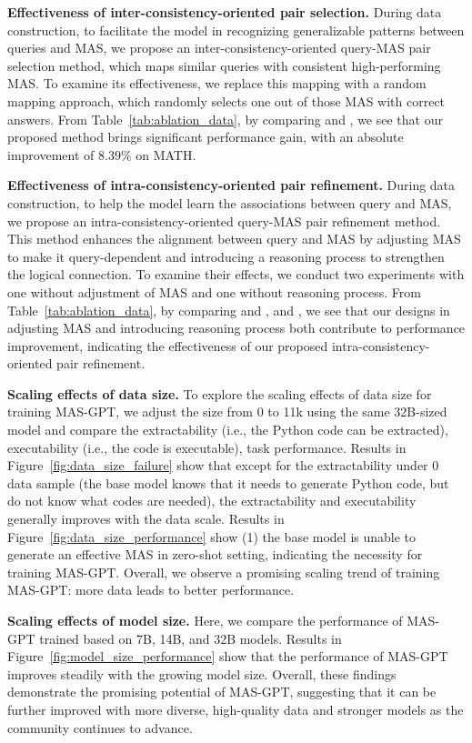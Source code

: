\documentclass{article}
\theoremstyle{plain}
\theoremstyle{definition}
\theoremstyle{remark}
\begin{document}
\textbf{Effectiveness of inter-consistency-oriented pair selection.}
During data construction, to facilitate the model in recognizing generalizable patterns between queries and MAS, we propose an inter-consistency-oriented query-MAS pair selection method, which maps similar queries with consistent high-performing MAS.
To examine its effectiveness, we replace this mapping with a random mapping approach, which randomly selects one out of those MAS with correct answers.
From Table~\ref{tab:ablation_data}, by comparing  and , we see that our proposed method brings significant performance gain, with an absolute improvement of $8.39\%$ on MATH.

\textbf{Effectiveness of intra-consistency-oriented pair refinement.}
During data construction, to help the model learn the associations between query and MAS, we propose an intra-consistency-oriented query-MAS pair refinement method.
This method enhances the alignment between query and MAS by adjusting MAS to make it query-dependent and introducing a reasoning process to strengthen the logical connection.
To examine their effects, we conduct two experiments with one without adjustment of MAS and one without reasoning process.
From Table~\ref{tab:ablation_data}, by comparing  and ,  and , we see that our designs in adjusting MAS and introducing reasoning process both contribute to performance improvement, indicating the effectiveness of our proposed intra-consistency-oriented pair refinement.

\textbf{Scaling effects of data size.}
To explore the scaling effects of data size for training MAS-GPT, we adjust the size from 0 to 11k using the same 32B-sized model and compare the extractability (i.e., the Python code can be extracted), executability (i.e., the code is executable), task performance.
Results in Figure~\ref{fig:data_size_failure} show that except for the extractability under 0 data sample (the base model knows that it needs to generate Python code, but do not know what codes are needed), the extractability and executability generally improves with the data scale.
Results in Figure~\ref{fig:data_size_performance} show (1) the base model is unable to generate an effective MAS in zero-shot setting, indicating the necessity for training MAS-GPT.
Overall, we observe a promising scaling trend of training MAS-GPT: more data leads to better performance.

\textbf{Scaling effects of model size.}
Here, we compare the performance of MAS-GPT trained based on 7B, 14B, and 32B models.
Results in Figure~\ref{fig:model_size_performance} show that the performance of MAS-GPT improves steadily with the growing model size.
Overall, these findings demonstrate the promising potential of MAS-GPT, suggesting that it can be further improved with more diverse, high-quality data and stronger models as the community continues to advance.
\end{document}
